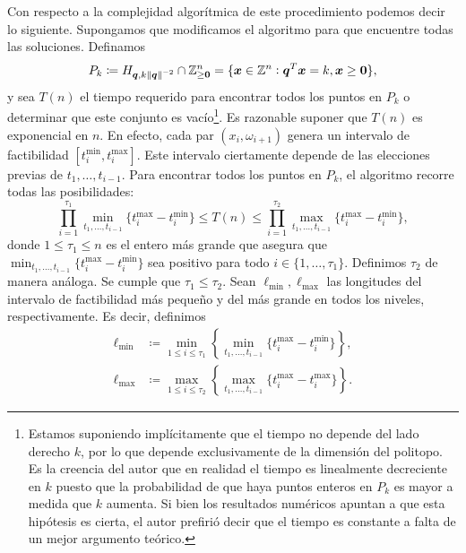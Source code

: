 Con respecto a la complejidad algorítmica de este procedimiento podemos decir lo siguiente.
Supongamos que modificamos el algoritmo para que encuentre todas las soluciones. Definamos
\begin{equation}
	\label{phase-1:def:feasible-layer}
	P_k \coloneq H_{\boldsymbol{q}, k\left\lVert \boldsymbol{q} \right\rVert^{-2}} \cap \mathbb{Z}_{\geq \boldsymbol{0}}^n
	=
	\lbrace \boldsymbol{x} \in \mathbb{Z}^n \vcentcolon \boldsymbol{q}^T\boldsymbol{x} = k, \boldsymbol{x} \geq \boldsymbol{0}
	\rbrace,
\end{equation}
y sea $T(n)$ el tiempo requerido para encontrar todos los puntos en $P_k$ o determinar que este
conjunto es vacío\footnote{Estamos suponiendo implícitamente que el tiempo no depende del lado
	derecho $k$, por lo que depende exclusivamente de la dimensión del politopo. Es la creencia del
	autor que en realidad el tiempo es linealmente decreciente en $k$ puesto que la probabilidad de
	que haya puntos enteros en $P_k$ es mayor a medida que $k$ aumenta. Si bien los resultados
	numéricos apuntan a que esta hipótesis es cierta, el autor prefirió decir que el tiempo es
constante a falta de un mejor argumento teórico.}. Es razonable suponer que $T(n)$ es exponencial en
$n$. En efecto, cada par $(x_i, \omega_{i + 1})$ genera un intervalo de factibilidad $[t_i^{\min},
t_i^{\max}]$. Este intervalo ciertamente depende de las elecciones previas de $t_1, \ldots, t_{i -
1}$. Para encontrar todos los puntos en $P_k$, el algoritmo recorre todas las posibilidades:
\begin{equation}
	\label{phase-1:complexity:bounds}
	\prod_{i=1}^{\tau_1} \min_{t_1, \ldots, t_{i-1}} \lbrace t_i^{\max} - t_i^{\min} \rbrace
	\leq T(n) \leq
	\prod_{i=1}^{\tau_2} \max_{t_1, \ldots, t_{i-1}} \lbrace t_i^{\max} - t_i^{\min} \rbrace,
\end{equation}
donde $1 \leq \tau_1 \leq n$ es el entero más grande que asegura que  $\min_{t_1, \ldots, t_{i -
1}}\lbrace t_i^{\max} - t_i^{\min} \rbrace$ sea positivo para todo $i \in \lbrace 1, \ldots, \tau_1
\rbrace$. Definimos $\tau_2$ de manera análoga. Se cumple que $\tau_1 \leq \tau_2$. Sean
$\ell_{\min}, \ell_{\max}$ las longitudes del intervalo de factibilidad más pequeño y del más grande
en todos los niveles, respectivamente. Es decir, definimos
\begin{align}
	\ell_{\min} &\coloneq \min_{1 \leq i \leq \tau_1} \left\lbrace \min_{t_1, \ldots, t_{i - 1}} \lbrace
	t_i^{\max} - t_i^{\min} \rbrace \right\rbrace,
	\\
	\ell_{\max} &\coloneq \max_{1 \leq i \leq \tau_2} \left\lbrace \max_{t_1, \ldots, t_{i - 1}} \lbrace
	t_i^{\max} - t_i^{\max} \rbrace \right\rbrace.
\end{align}

